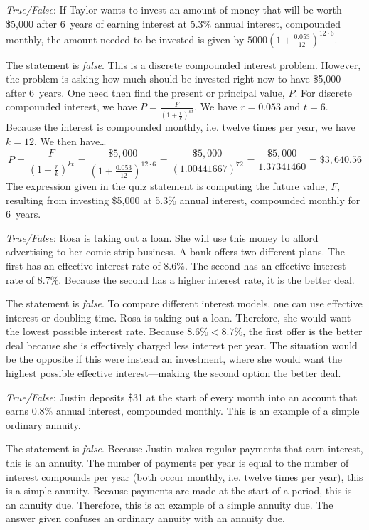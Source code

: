 \documentclass[11pt,letterpaper]{article}
\begin{document}
\quizsol \textit{True/False}: If Taylor wants to invest an amount of money that will be worth \$5,000 after 6~years of earning interest at 5.3\% annual interest, compounded monthly, the amount needed to be invested is given by $5000 \left(1 + \frac{0.053}{12} \right)^{12 \cdot 6}$. \pspace

\sol The statement is \textit{false}. This is a discrete compounded interest problem. However, the problem is asking how much should be invested right now to have \$5,000 after 6~years. One need then find the present or principal value, $P$. For discrete compounded interest, we have $P= \frac{F}{\left(1 + \frac{r}{k} \right)^{kt}}$. We have $r= 0.053$ and $t= 6$. Because the interest is compounded monthly, i.e. twelve times per year, we have $k= 12$. We then have\dots
	\[
	P= \dfrac{F}{\left(1 + \frac{r}{k} \right)^{kt}}= \dfrac{\$5,\!000}{\left(1 + \frac{0.053}{12} \right)^{12 \cdot 6}}= \dfrac{\$5,\!000}{(1.00441667)^{72}}= \dfrac{\$5,\!000}{1.37341460}= \$3,\!640.56
	\]
The expression given in the quiz statement is computing the future value, $F$, resulting from investing \$5,000 at 5.3\% annual interest, compounded monthly for 6~years. \pvspace{1.1cm}



\quizsol \textit{True/False}: Rosa is taking out a loan. She will use this money to afford advertising to her comic strip business. A bank offers two different plans. The first has an effective interest rate of 8.6\%. The second has an effective interest rate of 8.7\%. Because the second has a higher interest rate, it is the better deal. \pspace

\sol The statement is \textit{false}. To compare different interest models, one can use effective interest or doubling time. Rosa is taking out a loan. Therefore, she would want the lowest possible interest rate. Because $8.6\% < 8.7\%$, the first offer is the better deal because she is effectively charged less interest per year. The situation would be the opposite if this were instead an investment, where she would want the highest possible effective interest---making the second option the better deal. \pvspace{1.1cm}



\quizsol \textit{True/False}: Justin deposits \$31 at the start of every month into an account that earns 0.8\% annual interest, compounded monthly. This is an example of a simple ordinary annuity. \pspace

\sol The statement is \textit{false}. Because Justin makes regular payments that earn interest, this is an annuity. The number of payments per year is equal to the number of interest compounds per year (both occur monthly, i.e. twelve times per year), this is a simple annuity. Because payments are made at the start of a period, this is an annuity due. Therefore, this is an example of a simple annuity due. The answer given confuses an ordinary annuity with an annuity due. \pvspace{1.1cm}
\end{document}
